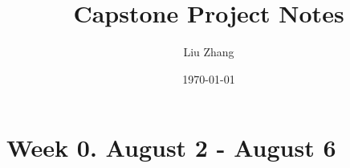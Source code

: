 \documentclass{article}
\title{Capstone Project Notes}
\author{Liu Zhang}
\date{\today}
\begin{document}
\maketitle
\section{Week 0. August 2 - August 6}
\end{document}
